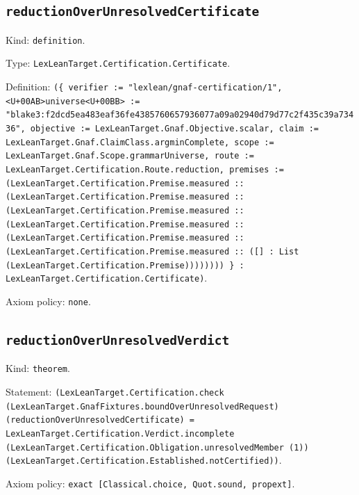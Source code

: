\documentclass[11pt]{article}
\begin{document}
\subsection*{\texttt{reductionOverUnresolvedCertificate}}
\noindent Kind: \texttt{definition}.\par
\noindent Type: \texttt{LexLeanTarget.Certification.Certificate}.\par
\noindent Definition: \texttt{(\{ verifier := "lexlean/gnaf-certification/1", <U+00AB>universe<U+00BB> := "blake3:f2dcd5ea483eaf36fe4385760657936077a09a02940d79d77c2f435c39a73436", objective := LexLeanTarget.Gnaf.Objective.scalar, claim := LexLeanTarget.Gnaf.ClaimClass.argminComplete, scope := LexLeanTarget.Gnaf.Scope.grammarUniverse, route := LexLeanTarget.Certification.Route.reduction, premises := (LexLeanTarget.Certification.Premise.measured :: (LexLeanTarget.Certification.Premise.measured :: (LexLeanTarget.Certification.Premise.measured :: (LexLeanTarget.Certification.Premise.measured :: (LexLeanTarget.Certification.Premise.measured :: (LexLeanTarget.Certification.Premise.measured :: ([] : List (LexLeanTarget.Certification.Premise)))))))) \} : LexLeanTarget.Certification.Certificate)}.\par
\noindent Axiom policy: \texttt{none}.\par
\subsection*{\texttt{reductionOverUnresolvedVerdict}}
\noindent Kind: \texttt{theorem}.\par
\noindent Statement: \texttt{(LexLeanTarget.Certification.check (LexLeanTarget.GnafFixtures.boundOverUnresolvedRequest) (reductionOverUnresolvedCertificate) = LexLeanTarget.Certification.Verdict.incomplete (LexLeanTarget.Certification.Obligation.unresolvedMember (1)) (LexLeanTarget.Certification.Established.notCertified))}.\par
\noindent Axiom policy: \texttt{exact [Classical.choice, Quot.sound, propext]}.\par
\end{document}
